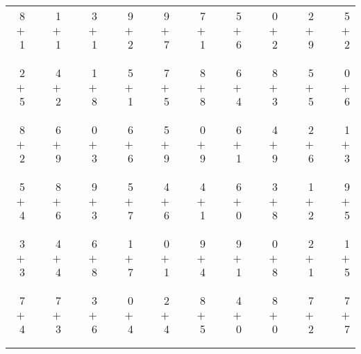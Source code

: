 \documentclass[12pt, letterpaper]{article}
\begin{document}
\begin{tabular}{rrrrrrrrrrrrrrrrrrr}
8 & & 1 & & 3 & & 9 & & 9 & & 7 & & 5 & & 0 & & 2 & & 5\\
$+$ 1 & & $+$ 1 & & $+$ 1 & & $+$ 2 & & $+$ 7 & & $+$ 1 & & $+$ 6 & & $+$ 2 & & $+$ 9 & & $+$ 2\\
\cline{1-1} \cline{3-3} \cline{5-5} \cline{7-7} \cline{9-9} \cline{11-11} \cline{13-13} \cline{15-15} \cline{17-17} \cline{19-19} \\ \\
2 & & 4 & & 1 & & 5 & & 7 & & 8 & & 6 & & 8 & & 5 & & 0\\
$+$ 5 & & $+$ 2 & & $+$ 8 & & $+$ 1 & & $+$ 5 & & $+$ 8 & & $+$ 4 & & $+$ 3 & & $+$ 5 & & $+$ 6\\
\cline{1-1} \cline{3-3} \cline{5-5} \cline{7-7} \cline{9-9} \cline{11-11} \cline{13-13} \cline{15-15} \cline{17-17} \cline{19-19} \\ \\
8 & & 6 & & 0 & & 6 & & 5 & & 0 & & 6 & & 4 & & 2 & & 1\\
$+$ 2 & & $+$ 9 & & $+$ 3 & & $+$ 6 & & $+$ 9 & & $+$ 9 & & $+$ 1 & & $+$ 9 & & $+$ 6 & & $+$ 3\\
\cline{1-1} \cline{3-3} \cline{5-5} \cline{7-7} \cline{9-9} \cline{11-11} \cline{13-13} \cline{15-15} \cline{17-17} \cline{19-19} \\ \\
5 & & 8 & & 9 & & 5 & & 4 & & 4 & & 6 & & 3 & & 1 & & 9\\
$+$ 4 & & $+$ 6 & & $+$ 3 & & $+$ 7 & & $+$ 6 & & $+$ 1 & & $+$ 0 & & $+$ 8 & & $+$ 2 & & $+$ 5\\
\cline{1-1} \cline{3-3} \cline{5-5} \cline{7-7} \cline{9-9} \cline{11-11} \cline{13-13} \cline{15-15} \cline{17-17} \cline{19-19} \\ \\
3 & & 4 & & 6 & & 1 & & 0 & & 9 & & 9 & & 0 & & 2 & & 1\\
$+$ 3 & & $+$ 4 & & $+$ 8 & & $+$ 7 & & $+$ 1 & & $+$ 4 & & $+$ 1 & & $+$ 8 & & $+$ 1 & & $+$ 5\\
\cline{1-1} \cline{3-3} \cline{5-5} \cline{7-7} \cline{9-9} \cline{11-11} \cline{13-13} \cline{15-15} \cline{17-17} \cline{19-19} \\ \\
7 & & 7 & & 3 & & 0 & & 2 & & 8 & & 4 & & 8 & & 7 & & 7\\
$+$ 4 & & $+$ 3 & & $+$ 6 & & $+$ 4 & & $+$ 4 & & $+$ 5 & & $+$ 0 & & $+$ 0 & & $+$ 2 & & $+$ 7\\
\cline{1-1} \cline{3-3} \cline{5-5} \cline{7-7} \cline{9-9} \cline{11-11} \cline{13-13} \cline{15-15} \cline{17-17} \cline{19-19} \\ \\

\end{tabular}
\end{document}
